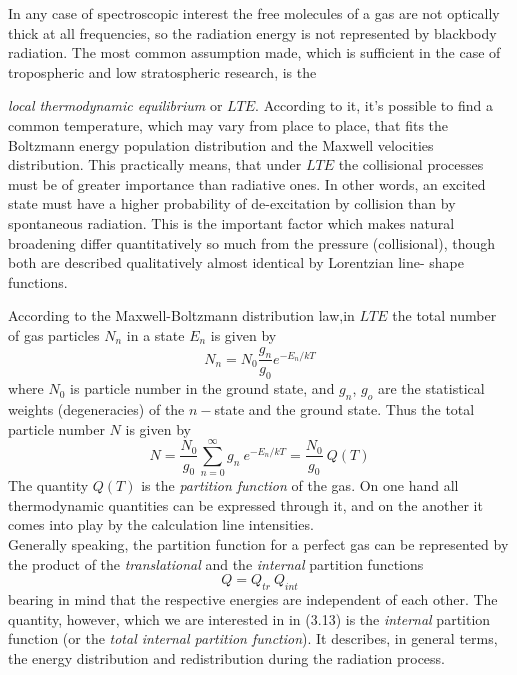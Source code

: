 In any case of spectroscopic interest the free molecules of a gas are
not optically thick at all frequencies, so the radiation energy is not
represented by blackbody radiation. The most common assumption made,
which is sufficient in the case of tropospheric and low stratospheric
research, is the {\textit{local thermodynamic equilibrium\nocorr} or $LTE$. According to it,
it's possible to find a common temperature, which may vary from place
to place, that fits the Boltzmann energy population distribution and
the Maxwell velocities distribution. This practically means, that
under $LTE$ the collisional processes must be of greater importance
than radiative ones. In other words, an excited state must have a
higher probability of de-excitation by collision than by spontaneous
radiation. This is the important factor which makes natural broadening
differ quantitatively so much from the pressure (collisional), though
both are described qualitatively almost identical by  Lorentzian line-
shape functions.

According  to the Maxwell-Boltzmann distribution law,in $LTE$ the total number
of gas particles $N_n$  in a state $E_n$ is given by 
\begin{equation}
 N_n=N_0\frac{g_n}{g_0}e^{-E_n/kT}
\label{}
\end{equation}
where $N_0$ is particle number in the ground state, and $g_n$, $g_o$
are the statistical weights (degeneracies) of the $n-$state and the
ground state. Thus the total particle number $N$ is given by
\begin{equation}
 N=\frac{N_0}{g_0}\sum_{n=0}^\infty g_n~e^{-E_n/kT}=\frac{N_0}{g_0}~Q(T)
\label{}
\end{equation}
The quantity $Q(T)$ is the {\it{partition function}\nocorr} of the gas. On
one hand all thermodynamic quantities can be expressed through it, and
on the another it comes into play by the calculation line intensities.\\
Generally speaking, the partition function for a perfect gas can be
represented by the product of the {\it{translational}\nocorr} and the {\it{internal}\nocorr} partition functions
\begin{equation}
 Q  =  Q_{tr}~Q_{int}
\label{}
\end{equation}
bearing in mind that the respective energies are independent of each
other. The quantity, however, which we are interested in in (3.13)
is the {\it{internal}\nocorr} partition function (or the  {\it{total internal
    partition function}\nocorr}). It describes, in general terms, the energy
distribution and redistribution during the radiation process. 

}
